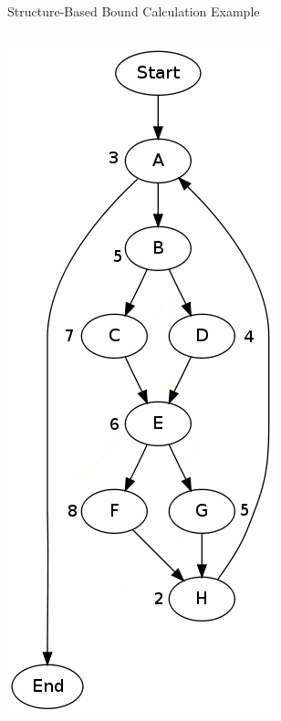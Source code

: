 \documentclass{beamer}
\begin{document}
\begin{frame}{Structure-Based Bound Calculation Example}
  \begin{columns}
    \begin{column}{0.25\textwidth}
      \includegraphics[scale=0.3]{structureoutput1.png}
    \end{column}
    \begin{column}{0.25\textwidth}

\end{column}
\end{columns}
\end{frame}
\end{document}
